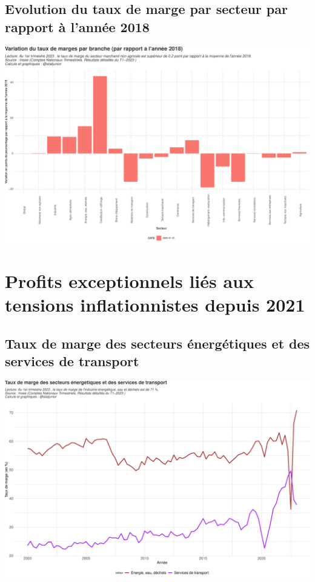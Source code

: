 \documentclass[
  paper=a4,
  ,captions=tableheading
]{scrartcl}
\begin{document}
\hypertarget{evolution-du-taux-de-marge-par-secteur-par-rapport-uxe0-lannuxe9e-2018}{%
\subsection{Evolution du taux de marge par secteur par rapport à l'année
2018}\label{evolution-du-taux-de-marge-par-secteur-par-rapport-uxe0-lannuxe9e-2018}}

\includegraphics{rapport_pdf_compte_branche_files/figure-latex/unnamed-chunk-22-1.pdf}

\newpage

\hypertarget{profits-exceptionnels-liuxe9s-aux-tensions-inflationnistes-depuis-2021}{%
\section{Profits exceptionnels liés aux tensions inflationnistes depuis
2021}\label{profits-exceptionnels-liuxe9s-aux-tensions-inflationnistes-depuis-2021}}

\hypertarget{taux-de-marge-des-secteurs-uxe9nerguxe9tiques-et-des-services-de-transport}{%
\subsection{Taux de marge des secteurs énergétiques et des services de
transport}\label{taux-de-marge-des-secteurs-uxe9nerguxe9tiques-et-des-services-de-transport}}

\includegraphics{rapport_pdf_compte_branche_files/figure-latex/unnamed-chunk-24-1.pdf}
\end{document}
